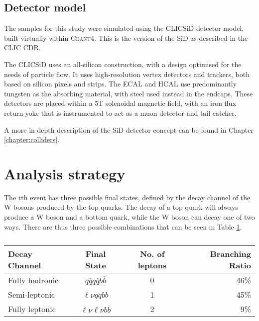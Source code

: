 \subsection{Detector model}
The samples for this study were simulated using the CLIC\textunderscore SiD detector model, built virtually within \textsc{Geant4}. This is the version of the \acrfull{SiD} as described in the \acrlong{CLIC} \acrfull{CDR}.

The CLIC\textunderscore SiD uses an all-silicon construction, with a design optimised for the needs of particle flow. It uses high-resolution vertex detectors and trackers, both based on silicon pixels and strips. The \acrshort{ECAL} and \acrshort{HCAL} use predominantly tungsten as the absorbing material, with steel used instead in the endcaps. These detectors are placed within a 5T solenoidal magnetic field, with an iron flux return yoke that is instrumented to act as a muon detector and tail catcher.

A more in-depth description of the \acrshort{SiD} detector concept can be found in Chapter \ref{chapter:colliders}.

\section{Analysis strategy}

The tth event has three possible final states, defined by the decay channel of the W bosons produced by the top quarks. The decay of a top quark will always produce a W boson and a bottom quark, while the W boson can decay one of two ways. There are thus three possible combinations that can be seen in Table \ref{table:physics/final-states}. \\

\begin{table}[h]
\centering
	\begin{tabular}{ l c c r }
	\hline \hline
	Decay Channel & Final State & No. of leptons & Branching Ratio \\ \hline \hline
	Fully hadronic & $q\overline{q}q\overline{q}b\overline{b}$ & 0 & 46\% \\ \hline
	Semi-leptonic &  $\ell \nu q\overline{q}b\overline{b}$ & 1 & 45\% \\ \hline
	Fully leptonic & $\ell \nu \ell \nu b\overline{b}$ & 2 & 9\% \\ \hline 
	\end{tabular}
	\caption{ }
	\label{table:physics/final-states}
\end{table}

